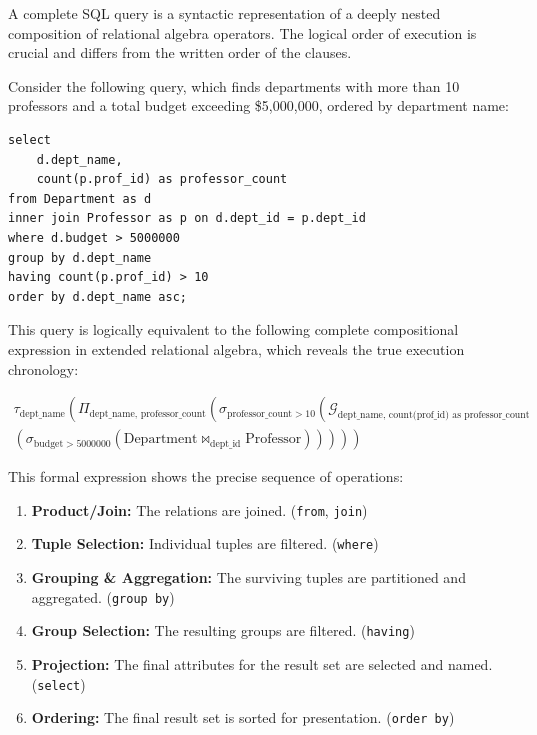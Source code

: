 \begin{remark}
A complete SQL query is a syntactic representation of a deeply nested composition of relational algebra operators. The logical order of execution is crucial and differs from the written order of the clauses.
\end{remark}

Consider the following query, which finds departments with more than 10 professors and a total budget exceeding \$5,000,000, ordered by department name:
\begin{verbatim}
select
    d.dept_name,
    count(p.prof_id) as professor_count
from Department as d
inner join Professor as p on d.dept_id = p.dept_id
where d.budget > 5000000
group by d.dept_name
having count(p.prof_id) > 10
order by d.dept_name asc;
\end{verbatim}

This query is logically equivalent to the following complete compositional expression in extended relational algebra, which reveals the true execution chronology:

\begin{equation*}
\begin{split}
\tau_{\text{dept\_name}} \left( \Pi_{\text{dept\_name, professor\_count}} \left( \sigma_{\text{professor\_count} > 10} \left( \mathcal{G}_{\text{dept\_name, count(prof\_id) as professor\_count}} \right. \right. \right. \\
\left. \left. \left. \left( \sigma_{\text{budget} > 5000000} \left( \text{Department} \bowtie_{\text{dept\_id}} \text{Professor} \right) \right) \right) \right) \right)
\end{split}
\end{equation*}

This formal expression shows the precise sequence of operations:
\begin{enumerate}
    \item \textbf{Product/Join:} The relations are joined. (\texttt{from}, \texttt{join})
    \item \textbf{Tuple Selection:} Individual tuples are filtered. (\texttt{where})
    \item \textbf{Grouping \& Aggregation:} The surviving tuples are partitioned and aggregated. (\texttt{group by})
    \item \textbf{Group Selection:} The resulting groups are filtered. (\texttt{having})
    \item \textbf{Projection:} The final attributes for the result set are selected and named. (\texttt{select})
    \item \textbf{Ordering:} The final result set is sorted for presentation. (\texttt{order by})
\end{enumerate}

